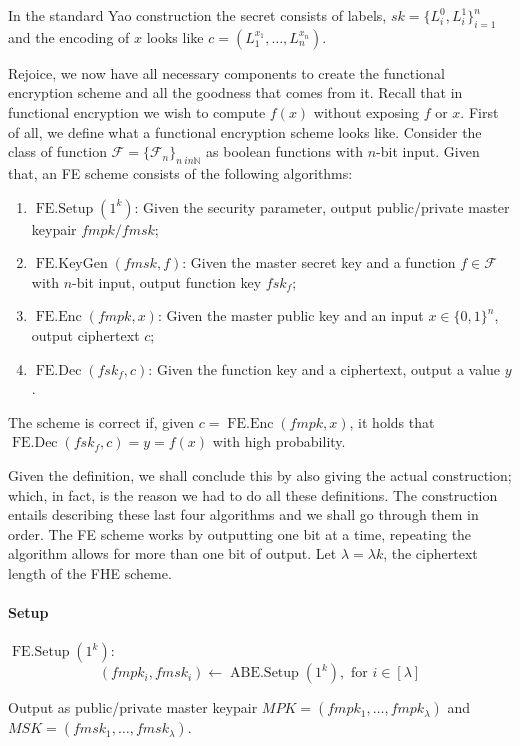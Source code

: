 \documentclass[11pt, a4paper]{article}
\newcommand{\op}[1]{\operatorname{#1}}
\begin{document}
In the standard Yao construction the secret consists of labels, $sk = \{ L_i^0, L_i^1 \}_{i=1}^n$ and the encoding of $x$ looks like $c = (L_1^{x_1}, \dots, L_n^{x_n})$.

Rejoice, we now have all necessary components to create the functional encryption scheme and all the goodness that comes from it.
Recall that in functional encryption we wish to compute $f(x)$ without exposing $f$ or $x$.
First of all, we define what a functional encryption scheme looks like.
Consider the class of function $\mathcal{F} = \{\mathcal{F}_n\}_{n \ in \mathbb{N}}$ as boolean functions with $n$-bit input.
Given that, an FE scheme consists of the following algorithms:
\begin{enumerate}
    \item $\op{FE.Setup}(1^k)$: Given the security parameter, output public/private master keypair $fmpk/fmsk$;
    \item $\op{FE.KeyGen}(fmsk, f)$: Given the master secret key and a function $f \in \mathcal{F}$ with $n$-bit input, output function key $fsk_f$;
    \item $\op{FE.Enc}(fmpk, x)$: Given the master public key and an input $x \in \{0,1\}^n$, output ciphertext $c$;
    \item $\op{FE.Dec}(fsk_f, c)$: Given the function key and a ciphertext, output a value $y$.
\end{enumerate}

The scheme is correct if, given $c = \op{FE.Enc}(fmpk, x)$, it holds that $\op{FE.Dec}(fsk_f, c) = y = f(x)$ with high probability.

Given the definition, we shall conclude this by also giving the actual construction; which, in fact, is the reason we had to do all these definitions.
The construction entails describing these last four algorithms and we shall go through them in order. The FE scheme works by outputting one bit at a time, repeating the algorithm allows for more than one bit of output. Let $\lambda = \lambda{k}$, the ciphertext length of the FHE scheme.

\paragraph{Setup}

$\op{FE.Setup}(1^k)$:
\[
    (fmpk_i, fmsk_i) \leftarrow \op{ABE.Setup}(1^k), \text{ for } i \in [\lambda]
\]

Output as public/private master keypair $MPK = (fmpk_1, \dots, fmpk_{\lambda})$ and $MSK = (fmsk_1, \dots, fmsk_{\lambda})$.
\end{document}
